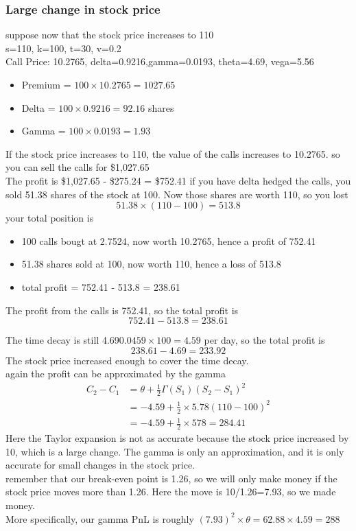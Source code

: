 \documentclass[12pt]{article}
\begin{document}
\subsubsection*{Large change in stock price}
suppose now that the stock price increases to 110
\\s=110, k=100, t=30, v=0.2
\\Call Price: 10.2765, delta=0.9216,gamma=0.0193, theta=4.69, vega=5.56
\begin{itemize}
    \item Premium = $100\times 10.2765 = 1027.65$
    \item Delta = $100\times 0.9216 = 92.16$ shares
    \item Gamma = $100\times 0.0193 = 1.93$
\end{itemize}
If the stock price increases to 110, the value of the calls increases to 10.2765. so you can sell the calls for \$1,027.65
\\The profit is \$1,027.65 - \$275.24 = \$752.41
if you have delta hedged the calls, you sold 51.38 shares of the stock at 100. Now those shares are worth 110, so you lost
\[ 51.38\times(110-100) = 513.8\]
your total position is
\begin{itemize}
    \item 100 calls bougt at 2.7524, now worth 10.2765, hence a profit of 752.41
    \item 51.38 shares sold at 100, now worth 110, hence a loss of 513.8
    \item total profit = 752.41 - 513.8 = 238.61
\end{itemize}

The profit from the calls is 752.41, so the total profit is
\[752.41 - 513.8 = 238.61\]

The time decay is still 4.69$0.0459\times 100 = 4.59$ per day, so the total profit is
\[238.61 - 4.69 = 233.92\]
The stock price increased enough to cover the time decay.
\\again the profit can be approximated by the gamma
\begin{equation}
\begin{aligned}
C_2 - C_1 &= \theta +\frac{1}{2}\Gamma(S_1)(S_2-S_1)^2\\
&= -4.59+ \frac{1}{2}\times 5.78(110-100)^2\\ 
&= -4.59+ \frac12 \times 578 = 284.41
\end{aligned}
\end{equation}
Here the Taylor expansion is not as accurate because the stock price increased by 10, which is a large change. The gamma is only an approximation, and it is only accurate for small changes in the stock price.
\\remember that our break-even point is 1.26, so we will only make money if the stock price moves more than 1.26. Here the move is 10/1.26=7.93, so we made money.
\\More specifically, our gamma PnL is roughly $(7.93)^2\times \theta=62.88\times 4.59=288$ 
\end{document}

